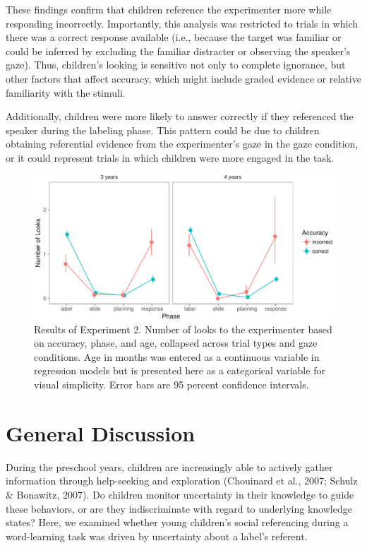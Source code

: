 \documentclass[english,man]{apa6}
\theoremstyle{definition}
\theoremstyle{definition}
\theoremstyle{definition}
\theoremstyle{remark}
\begin{document}
These findings confirm that children reference the experimenter more
while responding incorrectly. Importantly, this analysis was restricted
to trials in which there was a correct response available (i.e., because
the target was familiar or could be inferred by excluding the familiar
distracter or observing the speaker's gaze). Thus, children's looking is
sensitive not only to complete ignorance, but other factors that affect
accuracy, which might include graded evidence or relative familiarity
with the stimuli.

Additionally, children were more likely to answer correctly if they
referenced the speaker during the labeling phase. This pattern could be
due to children obtaining referential evidence from the experimenter's
gaze in the gaze condition, or it could represent trials in which
children were more engaged in the task.

\begin{figure}[htbp]
\centering
\includegraphics{figs/accresultse2-1.pdf}
\caption{\label{fig:accresultse2}Results of Experiment 2. Number of looks to
the experimenter based on accuracy, phase, and age, collapsed across
trial types and gaze conditions. Age in months was entered as a
continuous variable in regression models but is presented here as a
categorical variable for visual simplicity. Error bars are 95 percent
confidence intervals.}
\end{figure}

\section{General Discussion}\label{general-discussion}

During the preschool years, children are increasingly able to actively
gather information through help-seeking and exploration (Chouinard et
al., 2007; Schulz \& Bonawitz, 2007). Do children monitor uncertainty in
their knowledge to guide these behaviors, or are they indiscriminate
with regard to underlying knowledge states? Here, we examined whether
young children's social referencing during a word-learning task was
driven by uncertainty about a label's referent.
\end{document}
